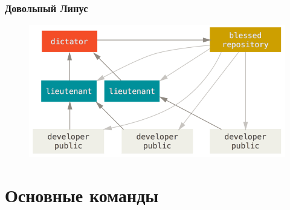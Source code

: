 \documentclass[pdf,russian,aspectratio=169]{beamer}
\begin{document}
\begin{frame}
    \frametitle{Довольный Линус}
    \begin{figure}
        \includegraphics[width=\textwidth]{dictator}
    \end{figure}
\end{frame}

\section{Основные команды}
\end{document}
